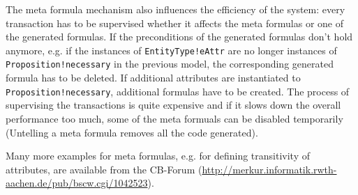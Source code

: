 The meta formula mechanism also influences the efficiency of the
system: every transaction has to be supervised whether it affects the
meta formulas or one of the generated formulas. If the preconditions
of the generated formulas don't hold anymore, e.g. if
the instances of {\tt EntityType!eAttr} are no longer instances of
{\tt Proposition!necessary} in the previous model, the corresponding
generated formula has to be deleted. If additional
attributes are instantiated to {\tt Proposition!necessary}, additional
formulas have to be created. The process of supervising
the transactions is quite expensive and if it slows down the
overall performance too much, some of the meta formuals can
be disabled temporarily (Untelling a meta formula removes all
the code generated).


Many more examples for meta formulas, e.g. for defining
transitivity of attributes, are available from
the CB-Forum (\url{http://merkur.informatik.rwth-aachen.de/pub/bscw.cgi/1042523}).

